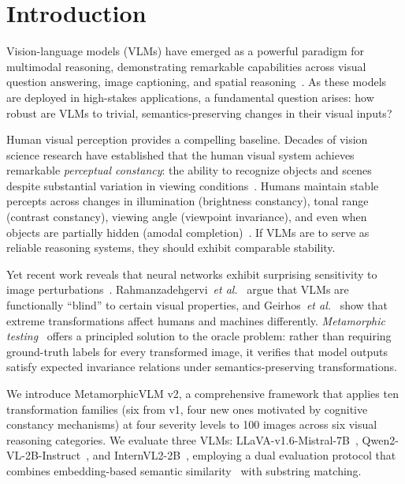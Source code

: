 \documentclass{cvpr}
\providecommand{\etal}{\textit{et al.}}
\begin{document}
\section{Introduction}
\label{sec:introduction}

Vision-language models (VLMs) have emerged as a powerful paradigm for multimodal reasoning, demonstrating remarkable capabilities across visual question answering, image captioning, and spatial reasoning~\cite{yin2023survey, liu2023llava, wang2024qwen2vl, chen2024internvl}. As these models are deployed in high-stakes applications, a fundamental question arises: how robust are VLMs to trivial, semantics-preserving changes in their visual inputs?

Human visual perception provides a compelling baseline. Decades of vision science research have established that the human visual system achieves remarkable \textit{perceptual constancy}: the ability to recognize objects and scenes despite substantial variation in viewing conditions~\cite{marr1982vision, palmer1999vision, walsh2014perceptual}. Humans maintain stable percepts across changes in illumination (brightness constancy), tonal range (contrast constancy), viewing angle (viewpoint invariance), and even when objects are partially hidden (amodal completion)~\cite{rock1989perception, dicarlo2012does, kanizsa1979organization}. If VLMs are to serve as reliable reasoning systems, they should exhibit comparable stability.

Yet recent work reveals that neural networks exhibit surprising sensitivity to image perturbations~\cite{hendrycks2019benchmarking, usama2025analysing, dong2023robust}. Rahmanzadehgervi~\etal~\cite{rahmanzadehgervi2024vision} argue that VLMs are functionally ``blind'' to certain visual properties, and Geirhos~\etal~\cite{geirhos2023extreme} show that extreme transformations affect humans and machines differently. \textit{Metamorphic testing}~\cite{chen2018metamorphic, segura2016survey} offers a principled solution to the oracle problem: rather than requiring ground-truth labels for every transformed image, it verifies that model outputs satisfy expected invariance relations under semantics-preserving transformations.

We introduce MetamorphicVLM v2, a comprehensive framework that applies ten transformation families (six from v1, four new ones motivated by cognitive constancy mechanisms) at four severity levels to 100 images across six visual reasoning categories. We evaluate three VLMs: LLaVA-v1.6-Mistral-7B~\cite{liu2023llava, liu2024improved}, Qwen2-VL-2B-Instruct~\cite{wang2024qwen2vl}, and InternVL2-2B~\cite{chen2024internvl}, employing a dual evaluation protocol that combines embedding-based semantic similarity~\cite{reimers2019sentence} with substring matching.
\end{document}
